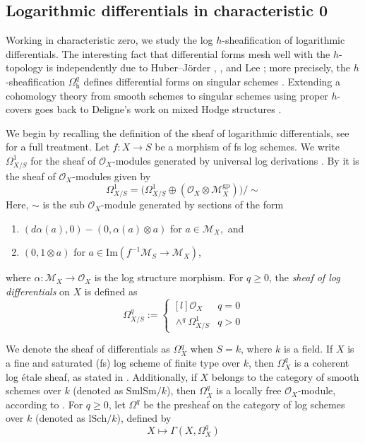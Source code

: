 \documentclass[10pt]{amsart}
\newcommand{\cM}{\mathcal{M}}
\newcommand{\cO}{\mathcal{O}}
\newcommand{\gp}{\mathrm{gp}}
\newcommand{\ul}{\underline}
\newcommand{\h}{\mathrm{h}}
\newcommand{\SmlSm}{\mathrm{SmlSm}}
\newcommand{\lSch}{\mathrm{lSch}}
\begin{document}
\subsection{Logarithmic differentials in characteristic 0}
\label{subsection:Logarithmic differentials in characteristic 0}
Working in characteristic zero, 
we study the log $h$-sheafification of logarithmic differentials.
The interesting fact that differential forms mesh well with the $h$-topology is 
independently due to Huber--Jörder \cite{HuberJorder}, \cite{Huber}, 
and Lee \cite{1251832562}; 
more precisely, 
the $h$-sheafification $\Omega_\h^q$ defines differential 
forms on singular schemes \cite[Theorem 3.6, Corollary 6.5]{HuberJorder}. 
Extending a cohomology theory from smooth schemes to singular schemes using proper 
$h$-covers goes back to Deligne's work on mixed Hodge structures \cite{HodgeIII}. 

We begin by recalling the definition of the sheaf of logarithmic differentials, 
see \cite[Chapter IV]{Ogu} for a full treatment. 
Let $f \colon X \to S$ be a morphism of fs log schemes. 
We write $\Omega^1_{X/S}$ for the sheaf of $\cO_X$-modules generated by universal log derivations 
\cite[Theorem IV.1.2.4]{Ogu}. 
By \cite[Theorem IV.1.2.4]{Ogu} it is the sheaf of $\mathcal{O}_X$-modules given by
\begin{equation}
\label{eqn:log differential}
\Omega^1_{X/S} = \big( \Omega_{\ul{X}/\ul{S}}^1 \oplus (\mathcal{O}_X \otimes \mathcal{M}^{\gp}_X) \big) / \sim
\end{equation}
Here, 
$\sim$ is the sub $\mathcal{O}_X$-module generated by sections of the form
\begin{enumerate}
 \item[(i)] $(d \alpha(a), 0) - (0, \alpha(a) \otimes a)$ for $a \in \mathcal{M}_X,$ and
 \item[(ii)] $(0, 1 \otimes a)$ for $a \in \text{Im}(f^{-1} \mathcal{M}_S \to \mathcal{M}_X)$,
\end{enumerate}
where $\alpha\colon \cM_X\to \cO_X$ is the log structure morphism.
For $q\geq 0$, the \emph{sheaf of log differentials} on $X$ is defined as 
\[
\Omega^q_{X/S} := 
\left\{
\begin{matrix*}[l]
    \cO_X & q = 0 \\
    \wedge^q \Omega^1_{X/S} & q > 0
\end{matrix*}
\right.
\]

We denote the sheaf of differentials as $\Omega^q_X$ when $S = k$, where $k$ is a field. If $X$ is a fine and saturated (fs) log scheme of finite type over $k$, then $\Omega^q_X$ is a coherent log étale sheaf, as stated in \cite[Chapter 9.1, Lemma 9.1.1]{logDM}. Additionally, if $X$ belongs to the category of smooth schemes over $k$ (denoted as $\SmlSm/k$), then $\Omega^q_X$ is a locally free $\mathcal{O}_X$-module, according to \cite[Proposition IV.3.2.1]{Ogu}.
For $q \geq 0$, let $\Omega^q$ be the presheaf on the category of log schemes over $k$ (denoted as $\lSch/k$), defined by 
$$X \longmapsto \Gamma(X, \Omega^q_X)$$
\end{document}

